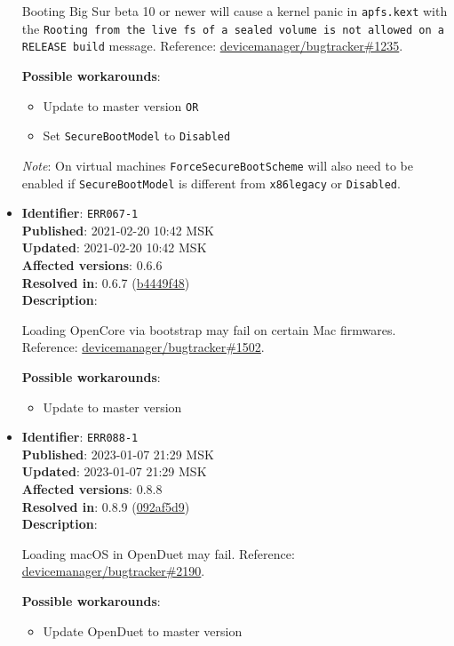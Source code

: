 \documentclass[]{article}
\providecommand{\tightlist}{%
  \setlength{\itemsep}{0pt}\setlength{\parskip}{0pt}}
\begin{document}
\begin{itemize}
  Booting Big Sur beta 10 or newer will cause a kernel panic in \texttt{apfs.kext} with the
  \texttt{Rooting from the live fs of a sealed volume is not allowed on a RELEASE build}
  message. Reference:
  \href{https://github.com/devicemanager/bugtracker/issues/1235}{devicemanager/bugtracker\#1235}.

  \textbf{Possible workarounds}:
  \begin{itemize}
    \tightlist

    \item Update to master version \texttt{OR}
    \item Set \texttt{SecureBootModel} to \texttt{Disabled}

  \end{itemize}

  \emph{Note}: On virtual machines \texttt{ForceSecureBootScheme} will also need
  to be enabled if \texttt{SecureBootModel} is different from \texttt{x86legacy}
  or \texttt{Disabled}.

\item
  \textbf{Identifier}: \texttt{ERR067-1} \\
  \textbf{Published}: 2021-02-20 10:42 MSK \\
  \textbf{Updated}: 2021-02-20 10:42 MSK \\
  \textbf{Affected versions}: 0.6.6 \\
  \textbf{Resolved in}: 0.6.7 (\href{https://github.com/devicemanager/OpenCorePkg/commit/b4449f48dd01703b5766352b6f29717415aff08b}{b4449f48}) \\
  \textbf{Description}:

  Loading OpenCore via bootstrap may fail on certain Mac firmwares. Reference:
  \href{https://github.com/devicemanager/bugtracker/issues/1502}{devicemanager/bugtracker\#1502}.

  \textbf{Possible workarounds}:
  \begin{itemize}
    \tightlist

    \item Update to master version

  \end{itemize}

\item
  \textbf{Identifier}: \texttt{ERR088-1} \\
  \textbf{Published}: 2023-01-07 21:29 MSK \\
  \textbf{Updated}: 2023-01-07 21:29 MSK \\
  \textbf{Affected versions}: 0.8.8 \\
  \textbf{Resolved in}: 0.8.9 (\href{https://github.com/devicemanager/OpenCorePkg/commit/092af5d99c764cbe06372dfed3fa03af719550cc}{092af5d9}) \\
  \textbf{Description}:

  Loading macOS in OpenDuet may fail. Reference:
  \href{https://github.com/devicemanager/bugtracker/issues/2190}{devicemanager/bugtracker\#2190}.

  \textbf{Possible workarounds}:
  \begin{itemize}
    \tightlist

    \item Update OpenDuet to master version

  \end{itemize}

\end{itemize}
\end{document}

